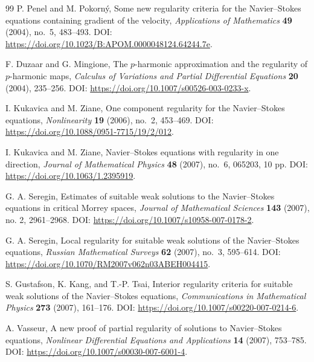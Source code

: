 \documentclass[11pt]{article}
\numberwithin{equation}{section}
\begin{document}
\begin{thebibliography}{99}
	P. Penel and M. Pokorn\'y,
	Some new regularity criteria for the Navier--Stokes equations containing gradient of the velocity,
	\newblock \emph{Applications of Mathematics} \textbf{49} (2004), no.~5, 483--493.
	\newblock DOI: \url{https://doi.org/10.1023/B:APOM.0000048124.64244.7e}.

	F. Duzaar and G. Mingione,
	The $p$-harmonic approximation and the regularity of $p$-harmonic maps,
	\newblock \emph{Calculus of Variations and Partial Differential Equations} \textbf{20} (2004), 235--256.
	\newblock DOI: \url{https://doi.org/10.1007/s00526-003-0233-x}.

	I. Kukavica and M. Ziane,
	One component regularity for the Navier--Stokes equations,
	\newblock \emph{Nonlinearity} \textbf{19} (2006), no.~2, 453--469.
	\newblock DOI: \url{https://doi.org/10.1088/0951-7715/19/2/012}.

	I. Kukavica and M. Ziane,
	Navier--Stokes equations with regularity in one direction,
	\newblock \emph{Journal of Mathematical Physics} \textbf{48} (2007), no.~6, 065203, 10 pp.
	\newblock DOI: \url{https://doi.org/10.1063/1.2395919}.

	G. A. Seregin,
	Estimates of suitable weak solutions to the Navier--Stokes equations in critical Morrey spaces,
	\newblock \emph{Journal of Mathematical Sciences} \textbf{143} (2007), no. 2, 2961--2968.
	\newblock DOI: \url{https://doi.org/10.1007/s10958-007-0178-2}.

	G. A. Seregin,
	Local regularity for suitable weak solutions of the Navier--Stokes equations,
	\newblock \emph{Russian Mathematical Surveys} \textbf{62} (2007), no.~3, 595--614.
	\newblock DOI: \url{https://doi.org/10.1070/RM2007v062n03ABEH004415}.

	S. Gustafson, K. Kang, and T.-P. Tsai,
	Interior regularity criteria for suitable weak solutions of the Navier--Stokes equations,
	\newblock \emph{Communications in Mathematical Physics} \textbf{273} (2007), 161--176.
	\newblock DOI: \url{https://doi.org/10.1007/s00220-007-0214-6}.

	A. Vasseur,
	A new proof of partial regularity of solutions to Navier--Stokes equations,
	\newblock \emph{Nonlinear Differential Equations and Applications} \textbf{14} (2007), 753--785.
	\newblock DOI: \url{https://doi.org/10.1007/s00030-007-6001-4}.


\end{thebibliography}
\end{document}
